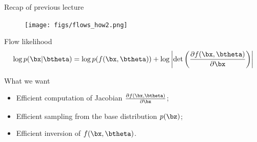 

\begin{frame}
\titlepage
\end{frame}
\begin{frame}{Recap of previous lecture}
	\begin{figure}
		\texttt{[image: figs/flows\_how2.png]}
	\end{figure}
	\vspace{-0.3cm}
		\begin{block}{Flow likelihood}
			\vspace{-0.3cm}
			\[
			\log p(\bx|\btheta) = \log p(f(\bx, \btheta)) + \log \left|\det \left( \frac{\partial f(\bx, \btheta)}{\partial \bx} \right) \right|
			\]
			\vspace{-0.5cm}
		\end{block}
		\begin{block}{What we want}
			\begin{itemize}
				\item Efficient computation of Jacobian $\frac{\partial f(\bx, \btheta)}{\partial \bx}$;
				\item Efficient sampling from the base distribution $p(\bz)$;
				\item Efficient inversion of $f(\bx, \btheta)$.
			\end{itemize}
			
		\end{block}
\end{frame}
